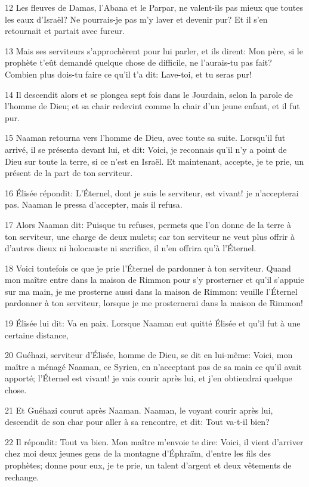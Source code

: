 \par 12 Les fleuves de Damas, l'Abana et le Parpar, ne valent-ils pas mieux que toutes les eaux d'Israël? Ne pourrais-je pas m'y laver et devenir pur? Et il s'en retournait et partait avec fureur.
\par 13 Mais ses serviteurs s'approchèrent pour lui parler, et ils dirent: Mon père, si le prophète t'eût demandé quelque chose de difficile, ne l'aurais-tu pas fait? Combien plus dois-tu faire ce qu'il t'a dit: Lave-toi, et tu seras pur!
\par 14 Il descendit alors et se plongea sept fois dans le Jourdain, selon la parole de l'homme de Dieu; et sa chair redevint comme la chair d'un jeune enfant, et il fut pur.
\par 15 Naaman retourna vers l'homme de Dieu, avec toute sa suite. Lorsqu'il fut arrivé, il se présenta devant lui, et dit: Voici, je reconnais qu'il n'y a point de Dieu sur toute la terre, si ce n'est en Israël. Et maintenant, accepte, je te prie, un présent de la part de ton serviteur.
\par 16 Élisée répondit: L'Éternel, dont je suis le serviteur, est vivant! je n'accepterai pas. Naaman le pressa d'accepter, mais il refusa.
\par 17 Alors Naaman dit: Puisque tu refuses, permets que l'on donne de la terre à ton serviteur, une charge de deux mulets; car ton serviteur ne veut plus offrir à d'autres dieux ni holocauste ni sacrifice, il n'en offrira qu'à l'Éternel.
\par 18 Voici toutefois ce que je prie l'Éternel de pardonner à ton serviteur. Quand mon maître entre dans la maison de Rimmon pour s'y prosterner et qu'il s'appuie sur ma main, je me prosterne aussi dans la maison de Rimmon: veuille l'Éternel pardonner à ton serviteur, lorsque je me prosternerai dans la maison de Rimmon!
\par 19 Élisée lui dit: Va en paix. Lorsque Naaman eut quitté Élisée et qu'il fut à une certaine distance,
\par 20 Guéhazi, serviteur d'Élisée, homme de Dieu, se dit en lui-même: Voici, mon maître a ménagé Naaman, ce Syrien, en n'acceptant pas de sa main ce qu'il avait apporté; l'Éternel est vivant! je vais courir après lui, et j'en obtiendrai quelque chose.
\par 21 Et Guéhazi courut après Naaman. Naaman, le voyant courir après lui, descendit de son char pour aller à sa rencontre, et dit: Tout va-t-il bien?
\par 22 Il répondit: Tout va bien. Mon maître m'envoie te dire: Voici, il vient d'arriver chez moi deux jeunes gens de la montagne d'Éphraïm, d'entre les fils des prophètes; donne pour eux, je te prie, un talent d'argent et deux vêtements de rechange.
